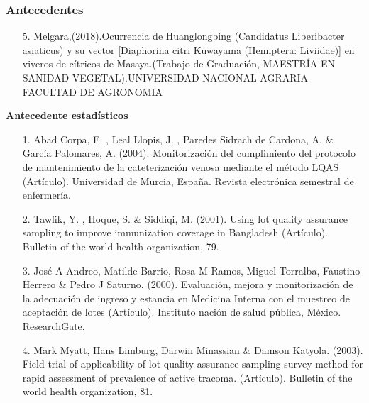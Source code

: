 \documentclass[11pt]{beamer}
\begin{document}
\begin{frame}
\frametitle{Antecedentes}
\begin{itemize}
\item[5.]Melgara,(2018).Ocurrencia de Huanglongbing (Candidatus Liberibacter asiaticus) y su vector [Diaphorina citri Kuwayama (Hemiptera: Liviidae)] en viveros de cítricos de Masaya.(Trabajo de Graduación, MAESTRÍA EN SANIDAD VEGETAL).UNIVERSIDAD NACIONAL AGRARIA
FACULTAD DE AGRONOMIA
\end{itemize}
\textbf{Antecedente estadísticos}
\begin{itemize}
\justifying
\item[1.]Abad Corpa, E. , Leal Llopis, J. , Paredes Sidrach de Cardona, A. \& García Palomares, A. (2004). Monitorización del cumplimiento del protocolo de mantenimiento de la cateterización venosa mediante el método LQAS (Artículo). Universidad de Murcia, España. Revista electrónica semestral de enfermería.
\item[2.] Tawfik, Y. , Hoque, S. \&  Siddiqi, M. (2001). Using lot quality assurance sampling to improve immunization coverage in Bangladesh (Artículo). Bulletin of the world health organization, 79.
\end{itemize}
\end{frame}

\begin{frame}
\begin{itemize}
\item[3.]José A Andreo, Matilde Barrio, Rosa M Ramos, Miguel Torralba, Faustino Herrero \& Pedro J Saturno. (2000). Evaluación, mejora y monitorización de la adecuación de ingreso y estancia en Medicina Interna con el muestreo de aceptación de lotes (Artículo). Instituto nación de salud pública, México. ResearchGate.
\item[4.]Mark Myatt, Hans Limburg, Darwin Minassian \& Damson Katyola. (2003). Field trial of applicability of lot quality assurance sampling survey method for rapid assessment of prevalence of active tracoma. (Artículo). Bulletin of the world health organization, 81.
\end{itemize}
\end{frame}
\end{document}

